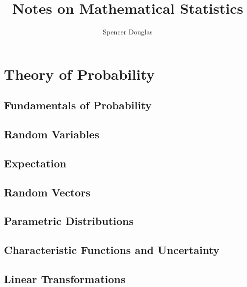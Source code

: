 \documentclass[12pt]{book}
\theoremstyle{definition}
\begin{document}
\title{Notes on Mathematical Statistics}
\author{Spencer Douglas}
\maketitle

\tableofcontents
\let\tableofcontents\relax

\part{Theory of Probability}

\chapter{Fundamentals of Probability}


\chapter{Random Variables}


\chapter{Expectation}


\chapter{Random Vectors}


\chapter{Parametric Distributions}


\chapter{Characteristic Functions and Uncertainty}


\chapter{Linear Transformations}

\end{document}
